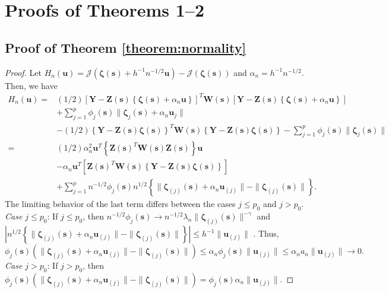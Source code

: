 \documentclass[authoryear,review, 12pt]{elsarticle}
\begin{document}
\appendix
\section{Proofs of Theorems 1--2}
\subsection*{Proof of Theorem \ref{theorem:normality}\label{sec:gaussian-normality-proof} }
\begin{proof}
Let $H_{n}(\bm{u})=\mathcal{J}\left(\bm{\zeta}(\bm{s})+h^{-1}n^{-1/2}\bm{u}\right)-\mathcal{J}\left(\bm{\zeta}(\bm{s})\right)$
and $\alpha_{n}=h^{-1}n^{-1/2}$. Then, we have 
\begin{align*}
H_{n}(\bm{u})= & (1/2)\left[\bm{Y}-\bm{Z}(\bm{s})\left\{ \bm{\zeta}(\bm{s})+\alpha_{n}\bm{u}\right\} \right]^{T}\bm{W}\!(\bm{s})\left[\bm{Y}-\bm{Z}(\bm{s})\left\{ \bm{\zeta}(\bm{s})+\alpha_{n}\bm{u}\right\} \right]\\
 & +\sum_{j=1}^{p}\phi_{j}(\bm{s})\|\bm{\zeta}_{j}(\bm{s})+\alpha_{n}\bm{u}_{j}\|\\
 & -(1/2)\left\{ \bm{Y}-\bm{Z}(\bm{s})\bm{\zeta}(\bm{s})\right\} ^{T}\bm{W}\!(\bm{s})\left\{ \bm{Y}-\bm{Z}(\bm{s})\bm{\zeta}(\bm{s})\right\} -\sum_{j=1}^{p}\phi_{j}(\bm{s})\|\bm{\zeta}_{j}(\bm{s})\|\\
= & \left(1/2\right)\alpha_{n}^{2}\bm{u}^{T}\left\{ \bm{Z}(\bm{s})^{T}\bm{W}\!(\bm{s})\bm{Z}(\bm{s})\right\} \bm{u}\\
 & -\alpha_{n}\bm{u}^{T}\left[\bm{Z}(\bm{s})^{T}\bm{W}\!(\bm{s})\left\{ \bm{Y}-\bm{Z}(\bm{s})\bm{\zeta}(\bm{s})\right\} \right]\\
 & +\sum_{j=1}^{p}n^{-1/2}\phi_{j}(\bm{s})n^{1/2}\left\{ \|\bm{\zeta}_{(j)}(\bm{s})+\alpha_{n}\bm{u}_{(j)}\|-\|\bm{\zeta}_{(j)}(\bm{s})\|\right\} .
\end{align*}
The limiting behavior of the last term differs between the cases $j\le p_{0}$
and $j>p_{0}$.
\emph{Case $j\le p_{0}$}: If $j\le p_{0}$, then $n^{-1/2}\phi_{j}(\bm{s})\to n^{-1/2}\lambda_{n}\|\bm{\zeta}_{(j)}(\bm{s})\|^{-\gamma}$
and $|n^{1/2}\left\{ \|\bm{\zeta}_{(j)}(\bm{s})+\alpha_{n}\bm{u}_{(j)}\|-\|\bm{\zeta}_{(j)}(\bm{s})\|\right\} |\le h^{-1}\|\bm{u}_{(j)}\|$
. Thus, 
\[
\phi_{j}(\bm{s})\left(\|\bm{\zeta}_{(j)}(\bm{s})+\alpha_{n}\bm{u}_{(j)}\|-\|\bm{\zeta}_{(j)}(\bm{s})\|\right)\le\alpha_{n}\phi_{j}(\bm{s})\|\bm{u}_{(j)}\|\le\alpha_{n}a_{n}\|\bm{u}_{(j)}\|\to0.
\]
\emph{Case $j>p_{0}$}: If $j>p_{0}$, then $\phi_{j}(\bm{s})\left(\|\bm{\zeta}_{(j)}(\bm{s})+\alpha_{n}\bm{u}_{(j)}\|-\|\bm{\zeta}_{(j)}(\bm{s})\|\right)=\phi_{j}(\bm{s})\alpha_{n}\|\bm{u}_{(j)}\|$.

\end{proof}
\end{document}
